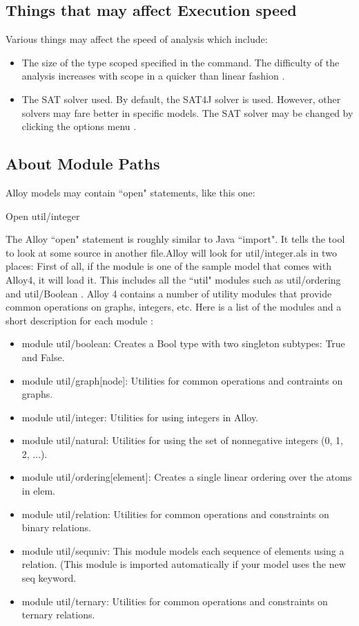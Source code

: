 \documentclass[a4paper,12pt]{report}
\begin{document}
\begin{onehalfspacing}
\subsection{Things that may affect Execution speed}
\label{Things affecting execution speed}

Various things may affect the speed of analysis which include:
\begin{itemize}
\item The size of the type scoped specified in the command. The difficulty of the analysis increases with scope in a quicker than linear fashion \cite{DanielJackson2004}.
\item The SAT solver used. By default, the SAT4J solver is used. However, other solvers may fare better in specific models. The SAT solver may be changed by clicking the options menu \cite{DanielJackson2004}.
\end{itemize}

\subsection{About Module Paths}
\label{Module Paths}

Alloy models may contain ``open" statements, like this one:

Open util/integer

The Alloy ``open" statement is roughly similar to Java ``import". It tells the tool to look at some source in another file.Alloy will look for util/integer.als in two places: First of all, if the module is one of the sample model that comes with Alloy4, it will load it. This includes all the ``util" modules such as util/ordering and util/Boolean \cite{DanielJackson2004}.
Alloy 4 contains a number of utility modules that provide common operations on graphs, integers, etc. Here is a list of the modules and a short description for each module \cite{DanielJackson2004}:
\begin{itemize}
\item module util/boolean: Creates a Bool type with two singleton subtypes: True and False. 
\item module util/graph[node]: Utilities for common operations and contraints on graphs. 
\item module util/integer: Utilities for using integers in Alloy. 
\item module util/natural: Utilities for using the set of nonnegative integers (0, 1, 2, ...). 
\item module util/ordering[element]: Creates a single linear ordering over the atoms in elem. 
\item module util/relation: Utilities for common operations and constraints on binary relations. 
\item module util/sequniv: This module models each sequence of elements using a relation.
(This module is imported automatically if your model uses the new seq keyword. 
\item module util/ternary: Utilities for common operations and constraints on ternary relations.
\end{itemize}


\end{onehalfspacing}
\end{document}
